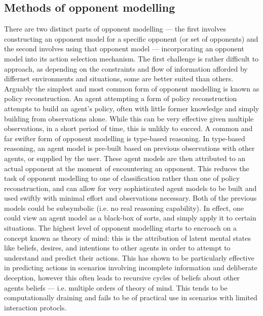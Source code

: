 \subsection{Methods of opponent modelling}
There are two distinct parts of opponent modelling --- the first involves constructing an opponent model for a specific opponent (or set of opponents) and the second involves using that opponent model --- incorporating an opponent model into its action selection mechanism. 
\newline \newline
The first challenge is rather difficult to approach, as depending on the constraints and flow of information afforded by differnet environments and situations, some are better suited than others. 
\newline \newline
Arguably the simplest and most common form of opponent modelling is known as policy reconstruction. An agent attempting a form of policy reconstruction attempts to build an agent's policy, often with little former knowledge and simply building from observations alone. While this can be very effective given multiple observations, in a short period of time, this is unlikly to succed. 
\newline \newline
A common and far swifter form of opponent modelling is type-based reasoning. In type-based reasoning, an agent model is pre-built based on previous observations with other agents, or supplied by the user. These agent models are then attributed to an actual opponent at the moment of encountering an opponent. This reduces the task of opponent modelling to one of classification rather than one of policy reconstruction, and can allow for very sophisticated agent models to be built and used swiftly with minimal effort and observations necessary. 
\newline \newline
Both of the previous models could be subsymbolic (i.e. no real reasoning capability). In effect, one could view an agent model as a black-box of sorts, and simply apply it to certain situations. The highest level of opponent modelling starts to encroach on a concept known as theory of mind: this is the attribution of latent mental states like beliefs, desires, and intentions to other agents in order to attempt to understand and predict their actions. This has shown to be particularly effective in predicting actions in scenarios involving incomplete information and deliberate deception, however this often leads to recursive cycles of beliefs about other agents beliefs --- i.e. multiple orders of theory of mind.  This tends to be computationally draining and fails to be of practical use in scenarios with limited interaction protocls. 
